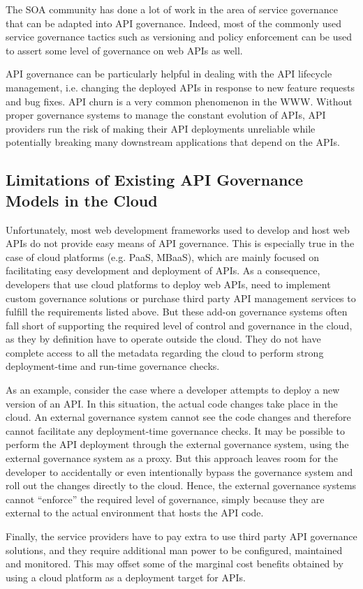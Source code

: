 The SOA community has done a lot of work in the area of service governance that can be adapted into
API governance. Indeed, most of the commonly used service governance tactics such as versioning and policy enforcement
can be used to assert some level of governance on web APIs as well.

API governance can be particularly helpful in dealing with the API lifecycle management, i.e. changing the deployed APIs in response to new
feature requests and bug fixes. API churn is a very common phenomenon in the WWW. Without
proper governance systems to manage the constant evolution of APIs, API providers run the risk of making their API deployments unreliable
while potentially breaking many downstream applications that depend on the APIs.

\subsection{Limitations of Existing API Governance Models in the Cloud}
Unfortunately, most web development frameworks used to develop and host web APIs do not provide easy means of API governance. This is
especially true in the case of cloud platforms (e.g. PaaS, MBaaS), which are mainly focused on facilitating easy development
and deployment of APIs. As a consequence, developers that use cloud platforms to deploy web APIs, 
need to implement custom governance solutions or purchase third party API management services to fulfill the requirements listed above. But 
these add-on governance
systems often fall short of supporting the required level of control and governance in the cloud, as they by definition have to operate outside the
cloud. They do not have complete access to all the metadata regarding the cloud to perform strong deployment-time and
run-time governance checks. 

As an example, consider the case where a developer attempts to deploy a new version of an API. In this
situation, the actual code changes take place in the cloud. An 
external governance system cannot see the code changes and therefore cannot facilitate any deployment-time governance checks.
It may be possible to perform the API deployment through the external governance system, using the external governance system
as a proxy. But this approach leaves room for the developer to accidentally
or even intentionally bypass the governance system and roll out the changes directly to the cloud. Hence, the external governance systems
cannot ``enforce'' the required level of governance, simply because they are external to the actual environment that hosts the API code.

Finally, the service providers have to pay extra to use third party API governance solutions, and they require
additional man power to be configured, maintained and monitored. This may offset some of the marginal cost benefits obtained
by using a cloud platform as a deployment target for APIs.
